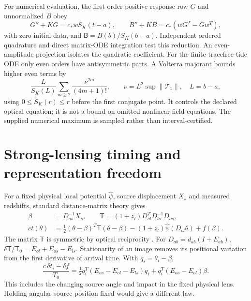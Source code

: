 \documentclass[11pt,a4paper]{article}
\begin{document}
For numerical evaluation, the first-order positive-response row $G$
and unnormalized $B$ obey
\begin{equation}
 G''+KG=c_*wS_K(t-a),\qquad
 B''+KB=c_*(wG^T-Gw^T),
 \label{eq:responseode}
\end{equation}
with zero initial data, and $\mathsf B=B(b)/S_K(b-a)$.
Independent ordered quadrature and direct matrix-ODE integration test
this reduction. An even-amplitude projection isolates the quadratic
coefficient. For the finite tracefree-tide ODE only even orders have
antisymmetric parts. A Volterra majorant bounds higher even terms by
\begin{equation}
 \frac{L}{S_K(L)}\sum_{m\ge2}\frac{\nu^{2m}}{(4m+1)!},\qquad
 \nu=L^2\sup\|\mathcal T_1\|,\quad L=b-a,
 \label{eq:majorant}
\end{equation}
using $0\le S_K(r)\le r$ before the first conjugate point. It controls
the declared optical equation; it is not a bound on omitted nonlinear
field equations. The supplied numerical maximum is sampled rather
than interval-certified.

\section{Strong-lensing timing and representation freedom}
\label{sec:lens}

For a fixed physical local potential $\widehat\psi$, source displacement
$X_s$ and measured redshifts, standard distance-matrix theory gives
\begin{align}
 \beta&=D_{os}^{-1}X_s,\qquad
 \mathsf T=(1+z_l)D_{ol}^TD_{ls}^{-1}D_{os},\nonumber\\
 ct(\theta)&=\tfrac12(\theta-\beta)^T\mathsf T(\theta-\beta)
 -(1+z_l)\widehat\psi(D_{ol}\theta)+f(\beta).
 \label{eq:fermat}
\end{align}
The matrix $\mathsf T$ is symmetric by optical reciprocity
\cite{Fleury2021Arbitrary}. For $D_{ab}=d_{ab}(I+E_{ab})$,
$\delta\mathsf T/\mathsf T_0=E_{ol}+E_{os}-E_{ls}$.
Stationarity of an image removes its positional variation from the
first derivative of arrival time. With $q_i=\theta_i-\beta$,
\begin{equation}
 \frac{c\,\delta t_i-\delta f}{T_0}
 =\tfrac12q_i^T(E_{os}-E_{ol}-E_{ls})q_i
 +q_i^T(E_{os}-E_{ol})\beta .
 \label{eq:dt}
\end{equation}
This includes the changing source angle and impact in the fixed physical
lens. Holding angular source position fixed would give a different law.
\end{document}
